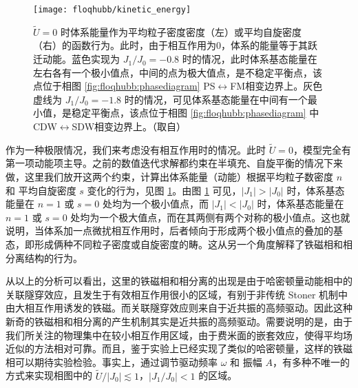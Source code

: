 \begin{figure}[!htb]
\centering
\texttt{[image: floqhubb/kinetic\_energy]}
\caption{$\tilde{U}=0$ 时体系能量作为平均粒子密度密度（左）或平均自旋密度（右）的函数行为。此时，由于相互作用为0，体系的能量等于其跃迁动能。蓝色实现为 $J_1/J_0=-0.8$ 时的情况，此时体系基态能量在左右各有一个极小值点，中间的点为极大值点，是不稳定平衡点，该点位于相图 \ref{fig:floqhubb:phasediagram} PS$\leftrightarrow$FM相变边界上。灰色虚线为 $J_1/J_0=-1.8$ 时的情况，可见体系基态能量在中间有一个最小值，是稳定平衡点，该点位于相图 \ref{fig:floqhubb:phasediagram} 中 CDW$\leftrightarrow$SDW相变边界上。（取自）}
\label{fig:floqhubb:kinetic}
\end{figure}

作为一种极限情况，我们来考虑没有相互作用时的情况。此时 $\tilde{U}=0$，模型完全有第一项动能项主导。之前的数值迭代求解都约束在半填充、自旋平衡的情况下来做，这里我们放开这两个约束，计算出体系能量（动能）根据平均粒子数密度 $n$ 和 平均自旋密度 $s$ 变化的行为，见图 \ref{fig:floqhubb:kinetic}。由图 \ref{fig:floqhubb:kinetic} 可见，$|J_1|>|J_0|$ 时，体系基态能量在 $n=1$ 或 $s=0$ 处均为一个极小值点，而 $|J_1|<|J_0|$ 时，体系基态能量在 $n=1$ 或 $s=0$ 处均为一个极大值点，而在其两侧有两个对称的极小值点。这也就说明，当体系加一点微扰相互作用时，后者倾向于形成两个极小值点的叠加的基态，即形成俩种不同粒子密度或自旋密度的畴。这从另一个角度解释了铁磁相和相分离结构的行为。


从以上的分析可以看出，这里的铁磁相和相分离的出现是由于哈密顿量动能相中的关联隧穿效应，且发生于有效相互作用很小的区域，有别于非传统 Stoner 机制中由大相互作用诱发的铁磁。而关联隧穿效应则来自于近共振的高频驱动。因此这种新奇的铁磁相和相分离的产生机制其实是近共振的高频驱动。需要说明的是，由于我们所关注的物理集中在较小相互作用区域，由于费米面的嵌套效应，使得平均场近似的方法相对可靠。而且，鉴于实验上已经实现了类似的哈密顿量\cite{correlated-tunnel-expr-2018-shaking}，这样的铁磁相可以期待实验检验。事实上，通过调节驱动频率 $\omega$ 和 振幅 $A$，有多种不唯一的方式来实现相图中的 $\tilde{U}/|J_0|\lesssim1$，$|J_1/J_0|<1$ 的区域。







